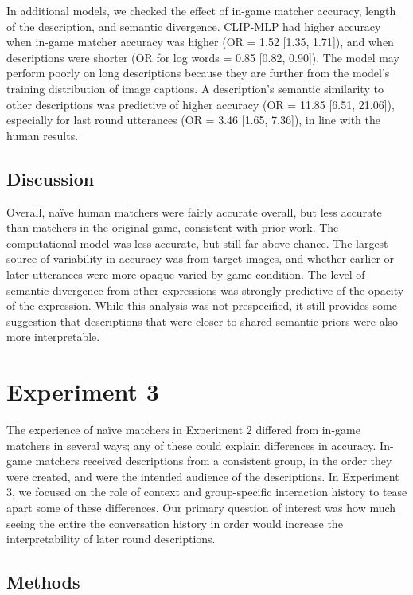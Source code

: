 \documentclass[10pt, letterpaper]{article}
\begin{document}
In additional models, we checked the effect of in-game matcher accuracy,
length of the description, and semantic divergence. CLIP-MLP had higher
accuracy when in-game matcher accuracy was higher (OR = 1.52 {[}1.35,
1.71{]}), and when descriptions were shorter (OR for log words = 0.85
{[}0.82, 0.90{]}). The model may perform poorly on long descriptions
because they are further from the model's training distribution of image
captions. A description's semantic similarity to other descriptions was
predictive of higher accuracy (OR = 11.85 {[}6.51, 21.06{]}), especially
for last round utterances (OR = 3.46 {[}1.65, 7.36{]}), in line with the
human results.

\subsection{Discussion}\label{discussion}

Overall, naïve human matchers were fairly accurate overall, but less
accurate than matchers in the original game, consistent with prior work.
The computational model was less accurate, but still far above chance.
The largest source of variability in accuracy was from target images,
and whether earlier or later utterances were more opaque varied by game
condition. The level of semantic divergence from other expressions was
strongly predictive of the opacity of the expression. While this
analysis was not prespecified, it still provides some suggestion that
descriptions that were closer to shared semantic priors were also more
interpretable.

\section{Experiment 3}\label{experiment-3}

The experience of naïve matchers in Experiment 2 differed from in-game
matchers in several ways; any of these could explain differences in
accuracy. In-game matchers received descriptions from a consistent
group, in the order they were created, and were the intended audience of
the descriptions. In Experiment 3, we focused on the role of context and
group-specific interaction history to tease apart some of these
differences. Our primary question of interest was how much seeing the
entire the conversation history in order would increase the
interpretability of later round descriptions.

\subsection{Methods}\label{methods-2}
\end{document}
